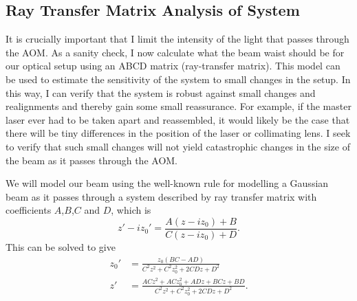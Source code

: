 \subsection{Ray Transfer Matrix Analysis of System}
It is crucially important that I limit the intensity of the light that passes through the AOM. As a sanity check, I now calculate what the beam waist should be for our optical setup using an ABCD matrix (ray-transfer matrix). This model can be used to estimate the sensitivity of the system to small changes in the setup. In this way, I can verify that the system is robust against small changes and realignments and thereby gain some small reassurance. For example, if the master laser ever had to be taken apart and reassembled, it would likely be the case that there will be tiny differences in the position of the laser or collimating lens. I seek to verify that such small changes will not yield catastrophic changes in the size of the beam as it passes through the AOM.  


We will model our beam using the well-known rule \cite{BYUOpticsBook}\cite{lasersMilonniEberly} for modelling a Gaussian beam as it passes through a system described by ray transfer matrix with coefficients $A$,$B$,$C$ and $D$, which is 
\begin{equation} \label{ABCDlawforGaussianBeams}
z'-iz_0'=\frac{A(z-iz_0)+B}{C(z-iz_0)+D}.
\end{equation}
This can be solved to give 
\begin{align}
z_0' &= \frac{ z_0 (BC-AD)}{C^2z^2+C^2z_0^2+2 C D z + D^2} \\
z' &=\frac{AC z^2+ACz_0^2+ADz+BCz+BD}{C^2z^2+C^2z_0^2+2 C D z + D^2}.
\end{align}



